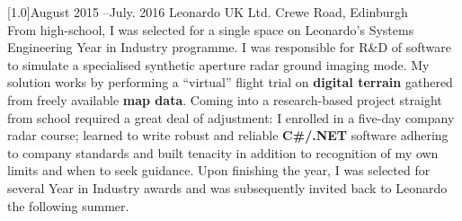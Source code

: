 \documentclass[]{cv-style}     %
\begin{document}
\begin{entrylist}
  {\scalebox{.8}[1.0]{August 2015 --July.  2016}}
  {Leonardo UK Ltd.}
  {Crewe Road, Edinburgh}
  {\\
 From high-school, I was selected for a single space on Leonardo's Systems Engineering Year in Industry programme. I was responsible for R\&D of software to simulate a specialised synthetic aperture radar ground imaging mode. My solution works by performing a ``virtual'' flight trial on \textbf{digital terrain} gathered from freely available \textbf{map data}.
 Coming into a research-based project straight from school required a great deal of adjustment: I enrolled in a five-day company radar course; learned to write robust and reliable \textbf{C\#/.NET} software adhering to company standards and built tenacity in addition to recognition of my own limits and when to seek guidance.
 Upon finishing the year, I was selected for several Year in Industry awards and was subsequently invited back to Leonardo the following summer.
}


\end{entrylist}
\end{document}
